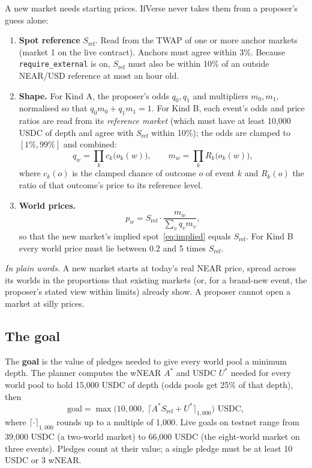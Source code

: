\documentclass[11pt,a4paper]{article}
\newcommand{\code}[1]{\texttt{\small #1}}
\newcommand{\inwords}[1]{\par\noindent\colorbox{note}{\parbox{\dimexpr\linewidth-2\fboxsep}{\small\textit{In plain words.} #1}}\par}
\begin{document}
A new market needs starting prices. IfVerse never takes them from a proposer's guess alone:
\begin{enumerate}
\item \textbf{Spot reference} $S_{\text{ref}}$. Read from the TWAP of one or more anchor markets (market 1 on the live
contract). Anchors must agree within 3\%. Because \code{require\_external} is on, $S_{\text{ref}}$ must also be within
10\% of an outside NEAR/USD reference at most an hour old.
\item \textbf{Shape.} For Kind A, the proposer's odds $q_0, q_1$ and multipliers $m_0, m_1$, normalised so that
$q_0 m_0 + q_1 m_1 = 1$. For Kind B, each event's odds and price ratios are read from its \emph{reference market}
(which must have at least 10,000 USDC of depth and agree with $S_{\text{ref}}$ within 10\%); the odds are clamped to
$[1\%, 99\%]$ and combined:
\begin{equation}
  q_w = \prod_{k} c_k\big(o_k(w)\big), \qquad m_w = \prod_k R_k\big(o_k(w)\big),
  \label{eq:kindb}
\end{equation}
where $c_k(o)$ is the clamped chance of outcome $o$ of event $k$ and $R_k(o)$ the ratio of that outcome's price to
its reference level.
\item \textbf{World prices.}
\begin{equation}
  p_w = S_{\text{ref}} \cdot \frac{m_w}{\sum_v q_v m_v},
  \label{eq:shape}
\end{equation}
so that the new market's implied spot~\eqref{eq:implied} equals $S_{\text{ref}}$. For Kind B every world price
must lie between 0.2 and 5 times $S_{\text{ref}}$.
\end{enumerate}
\inwords{A new market starts at today's real NEAR price, spread across its worlds in the proportions that existing
markets (or, for a brand-new event, the proposer's stated view within limits) already show. A proposer cannot open a
market at silly prices.}

\subsection{The goal}

The \textbf{goal} is the value of pledges needed to give every world pool a minimum depth. The planner computes the
wNEAR $A^\ast$ and USDC $U^\ast$ needed for every world pool to hold 15,000 USDC of depth (odds pools get 25\% of that
depth), then
\begin{equation}
  \text{goal} = \max\!\Big(10{,}000,\; \big\lceil A^\ast S_{\text{ref}} + U^\ast \big\rceil_{1{,}000}\Big) \text{ USDC},
  \label{eq:goal}
\end{equation}
where $\lceil\cdot\rceil_{1{,}000}$ rounds up to a multiple of 1,000. Live goals on testnet range from 39,000 USDC
(a two-world market) to 66,000 USDC (the eight-world market on three events). Pledges count at their value; a single
pledge must be at least 10 USDC or 3 wNEAR.
\end{document}
